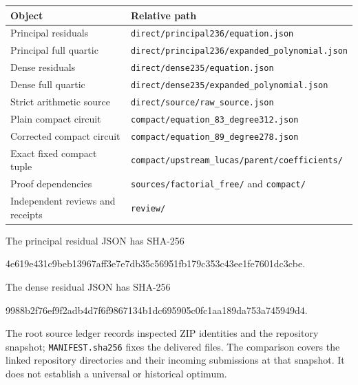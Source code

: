 \documentclass[11pt]{article}
\theoremstyle{definition}
\begin{document}
\begin{center}\small
\begin{tabular}{ll}
\toprule
Object & Relative path\\
\midrule
Principal residuals &\nolinkurl{direct/principal236/equation.json}\\
Principal full quartic &\nolinkurl{direct/principal236/expanded_polynomial.json}\\
Dense residuals &\nolinkurl{direct/dense235/equation.json}\\
Dense full quartic &\nolinkurl{direct/dense235/expanded_polynomial.json}\\
Strict arithmetic source &\nolinkurl{direct/source/raw_source.json}\\
Plain compact circuit &\nolinkurl{compact/equation_83_degree312.json}\\
Corrected compact circuit &\nolinkurl{compact/equation_89_degree278.json}\\
Exact fixed compact tuple &\nolinkurl{compact/upstream_lucas/parent/coefficients/}\\
Proof dependencies &\nolinkurl{sources/factorial_free/} and \nolinkurl{compact/}\\
Independent reviews and receipts &\nolinkurl{review/}\\
\bottomrule
\end{tabular}
\end{center}

The principal residual JSON has SHA-256
\begin{center}\small\ttfamily
4e619e431c9beb13967aff3e7e7db35c56951fb179c353c43ee1fe7601dc3cbe.
\end{center}
The dense residual JSON has SHA-256
\begin{center}\small\ttfamily
9988b2f76ef9f2adb4d7f6f9867134b1dc695905c0fc1aa189da753a745949d4.
\end{center}
The root source ledger records inspected ZIP identities and the repository
snapshot; \nolinkurl{MANIFEST.sha256} fixes the delivered files. The
comparison covers the linked repository directories and their incoming
submissions at that snapshot. It does not establish a universal or
historical optimum.
\end{document}
